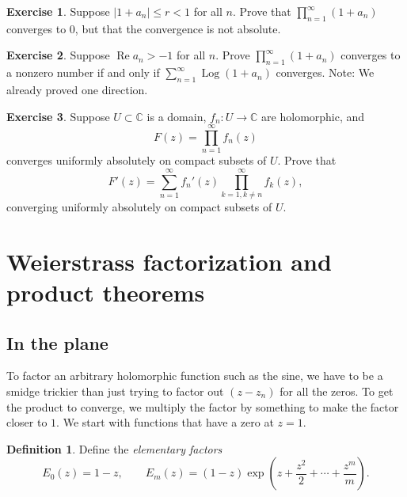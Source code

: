 \documentclass[12pt,openany]{book}
\renewcommand{\Re}{\operatorname{Re}}
\newcommand{\Log}{\operatorname{Log}}
\newcommand{\sabs}[1]{\lvert {#1} \rvert}
\newcommand{\C}{{\mathbb{C}}}
\newcommand{\myindex}[1]{#1\index{#1}}
\theoremstyle{plain}
\theoremstyle{remark}
\theoremstyle{definition}
\newtheorem{defn}[thm]{Definition}
\newenvironment{exbox}{%
    \def\FrameCommand{\vrule width 1pt \relax\hspace{10pt}}%
    \MakeFramed{\advance\hsize-\width\FrameRestore}%
}{%
    \endMakeFramed
}
\theoremstyle{exercise}
\newtheorem{exercise}{Exercise}[section]
\theoremstyle{example}
\begin{document}
\begin{exbox}
\begin{exercise}
Suppose $\sabs{1+a_n} \leq r < 1$ for all $n$.
Prove that $\prod_{n=1}^\infty (1+a_n)$ converges to $0$, but that the
convergence is not absolute.
\end{exercise}

\begin{exercise}
Suppose $\Re a_n > -1$ for all $n$.  
Prove 
$\prod_{n=1}^\infty (1+a_n)$
converges to a nonzero number if and only if
$\sum_{n=1}^\infty \Log (1+a_n)$ converges.  Note: We already proved one
direction.
\end{exercise}

\begin{exercise}%
\label{exercise:proddiff}
Suppose $U \subset \C$ is a domain,
$f_n \colon U \to \C$ are holomorphic, and
\begin{equation*}
F(z) = \prod_{n=1}^\infty f_n(z)
\end{equation*}
converges uniformly absolutely
on compact subsets of $U$.  Prove that
\begin{equation*}
F'(z) = \sum_{n=1}^\infty f_n'(z) \prod_{k=1, k\not=n}^\infty f_k(z) ,
\end{equation*}
converging uniformly absolutely on compact subsets of $U$.
\end{exercise}
\end{exbox}


\section{Weierstrass factorization and product theorems}
\label{sec:weier}

\subsection{In the plane}

To factor an arbitrary holomorphic function such as the sine,
we have to be a smidge trickier than just trying to factor out $(z-z_n)$
for all the zeros.  To
get the product to converge, we multiply the factor by something to
make the factor closer to $1$.  We start with functions that have a zero at
$z=1$.

\begin{defn}
Define the \emph{\myindex{elementary factors}}
%
\begin{equation*}
E_0(z) = 1-z, \qquad
E_m(z) = (1-z) \exp\left( z +\frac{z^2}{2} + \cdots + \frac{z^m}{m} \right)
.
\end{equation*}
\end{defn}
\end{document}
